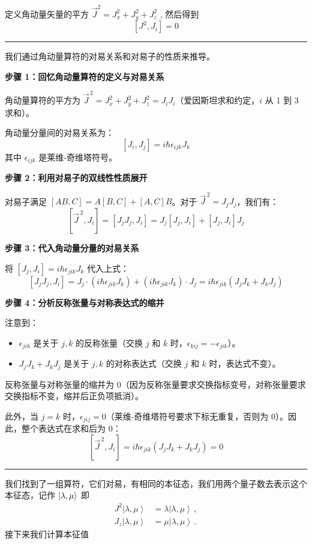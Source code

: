 定义角动量矢量的平方 ${{\vec J}^2} = J_x^2 + J_y^2 + J_z^2$ , 然后得到
\begin{equation}\label{6.18}
	\left[ {{J^2},{J_i}} \right] = 0
\end{equation}
\noindent\rule{\textwidth}{0.4pt}
\begin{proof*}
	我们通过角动量算符的对易关系和对易子的性质来推导。
	
	\textbf{步骤 1：回忆角动量算符的定义与对易关系}
	
	角动量算符的平方为 \( \vec{J}^{\,2} = J_x^2 + J_y^2 + J_z^2 = J_i J_i \)（爱因斯坦求和约定，$i$ 从 1 到 3 求和）。
	
	角动量分量间的对易关系为：
	\[
	[J_i, J_j] = i\hbar \epsilon_{ijk} J_k
	\]
	其中 \( \epsilon_{ijk} \) 是莱维-奇维塔符号。
	
	\textbf{步骤 2：利用对易子的双线性性质展开}
	
	对易子满足 \( [AB, C] = A[B, C] + [A, C]B \)。对于 \( \vec{J}^{\,2} = J_j J_j \)，我们有：
	\[
	[\vec{J}^{\,2}, J_i] = [J_j J_j, J_i] = J_j [J_j, J_i] + [J_j, J_i] J_j
	\]
	
	\textbf{步骤 3：代入角动量分量的对易关系}
	
	将 \( [J_j, J_i] = i\hbar \epsilon_{j i k} J_k \) 代入上式：
	\[
	[J_j J_j, J_i] = J_j \cdot (i\hbar \epsilon_{j i k} J_k) + (i\hbar \epsilon_{j i k} J_k) \cdot J_j = i\hbar \epsilon_{j i k} (J_j J_k + J_k J_j)
	\]
	
	\textbf{步骤 4：分析反称张量与对称表达式的缩并}
	
	注意到：
	\begin{itemize}
		\item \( \epsilon_{j i k} \) 是关于 \(j, k\) 的反称张量（交换 \(j\) 和 \(k\) 时，\( \epsilon_{k i j} = -\epsilon_{j i k} \)）。
		\item \( J_j J_k + J_k J_j \) 是关于 \(j, k\) 的对称表达式（交换 \(j\) 和 \(k\) 时，表达式不变）。
	\end{itemize}
	
	反称张量与对称张量的缩并为 0（因为反称张量要求交换指标变号，对称张量要求交换指标不变，缩并后正负项抵消）。
	
	此外，当 \(j = k\) 时，\( \epsilon_{j i j} = 0 \)（莱维-奇维塔符号要求下标无重复，否则为 0）。因此，整个表达式在求和后为 0：
	\[
	[\vec{J}^{\,2}, J_i] = i\hbar \epsilon_{j i k} (J_j J_k + J_k J_j) = 0
	\]
\end{proof*}
\noindent\rule{\textwidth}{0.4pt}

我们找到了一组算符，它们对易，有相同的本征态，我们用两个量子数去表示这个本征态，记作 $\ket{\lambda ,\mu }$
即
\begin{equation}
	\begin{aligned}
		{J^2}\left| {\lambda ,\mu } \right\rangle  &= \lambda \left| {\lambda ,\mu } \right\rangle  \,, \\
		{J_z}\left| {\lambda ,\mu } \right\rangle  &= \mu \left| {\lambda ,\mu } \right\rangle  \,.
	\end{aligned} 
\end{equation}
接下来我们计算本征值

